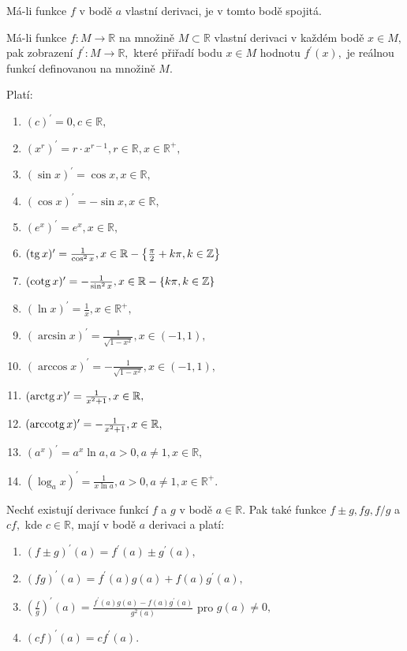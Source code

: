 \begin{veta}[Bolzanova]
Má-li funkce $f$ v bodě $a$ vlastní derivaci, je v tomto bodě spojitá.
\end{veta}

\begin{pozn}
    Má-li funkce $f:M\to \mathbb R$ na množině $M\subset \mathbb R$ vlastní derivaci
    v každém bodě $x\in M,$ pak zobrazení $f^\prime:M\to \mathbb R,$ které přiřadí
    bodu $x\in M$ hodnotu $f^\prime(x),$ je reálnou funkcí definovanou na množině $M$.
\end{pozn}

\begin{pozn}
Platí:
\begin{enumerate}[$i.$]
\item $(c)^\prime = 0, c \in \mathbb R,$
\item $(x^r)^\prime = r\cdot x^{r-1}, r\in \mathbb R, x \in \mathbb R^+,$
\item $(\sin x)^\prime = \cos x, x \in \mathbb R,$
\item $(\cos x) ^\prime = -\sin x, x \in \mathbb R,$
\item $(e^x)^\prime = e^x,x \in \mathbb R,$
\item $(\operatorname{tg} x)^\prime = \frac{1}{\cos^2 x}, x \in \mathbb R-\left \{ \frac{\pi}{2}+k\pi, k\in \mathbb Z \right \} $
\item $(\operatorname{cotg} x)^\prime = -\frac{1}{\sin^2 x}, x \in \mathbb R-\left \{ k\pi, k \in \mathbb Z \right \} $
\item $(\ln x)^\prime = \frac{1}{x}, x \in \mathbb R^+,$
\item $(\arcsin x)^\prime = \frac{1}{\sqrt{1-x^2}}, x \in(-1,1),$
\item $(\arccos x)^\prime=-\frac{1}{\sqrt{1-x^2} }, x \in (-1,1),$
\item $(\operatorname{arctg} x)^\prime = \frac{1}{x^2+1}, x \in \mathbb R,$
\item $(\operatorname{arccotg} x)^\prime = -\frac{1}{x^2+1}, x \in \mathbb R,$
\item $(a^x)^\prime = a^x \ln a, a>0, a\ne 1, x\in \mathbb R,$
\item $(\log_a x)^\prime=\frac{1}{x\ln a}, a>0, a\ne 1, x \in \mathbb R^+.$
\end{enumerate}
\end{pozn}

\begin{veta}
Nechť existují derivace funkcí $f$ a $g$ v bodě $a\in \mathbb R.$ Pak
také funkce $f\pm g, fg, f/g$ a $cf,$ kde $c\in \mathbb R$, mají v bodě $a$ derivaci a platí:
\begin{enumerate}[$i.$]
\item $(f\pm g)^\prime (a) = f^\prime(a) \pm g^\prime(a),$
\item $(fg)^\prime (a) = f^\prime (a)g(a)+ f(a)g^\prime(a),$
\item $\left ( \frac{f}{g} \right )^\prime(a)=\frac{f^\prime (a)g(a)-f(a)g^\prime(a)}{g^2(a)} $ pro $g(a)\ne 0,$
\item $(cf)^\prime(a)=cf^\prime (a).$
\end{enumerate}
\end{veta}


